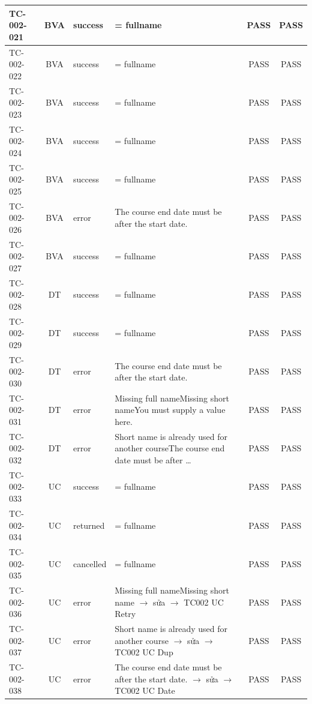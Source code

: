 {\begin{longtable}{|l|c|L{1.4cm}|L{6.0cm}|c|c|}
TC-002-021 & BVA & success & = fullname & PASS & PASS \\ \hline
TC-002-022 & BVA & success & = fullname & PASS & PASS \\ \hline
TC-002-023 & BVA & success & = fullname & PASS & PASS \\ \hline
TC-002-024 & BVA & success & = fullname & PASS & PASS \\ \hline
TC-002-025 & BVA & success & = fullname & PASS & PASS \\ \hline
TC-002-026 & BVA & error & The course end date must be after the start date. & PASS & PASS \\ \hline
TC-002-027 & BVA & success & = fullname & PASS & PASS \\ \hline
TC-002-028 & DT & success & = fullname & PASS & PASS \\ \hline
TC-002-029 & DT & success & = fullname & PASS & PASS \\ \hline
TC-002-030 & DT & error & The course end date must be after the start date. & PASS & PASS \\ \hline
TC-002-031 & DT & error & Missing full name\textbar{}Missing short name\textbar{}You must supply a value here. & PASS & PASS \\ \hline
TC-002-032 & DT & error & Short name is already used for another course\textbar{}The course end date must be after \dots{} & PASS & PASS \\ \hline
TC-002-033 & UC & success & = fullname & PASS & PASS \\ \hline
TC-002-034 & UC & returned & = fullname & PASS & PASS \\ \hline
TC-002-035 & UC & cancelled & = fullname & PASS & PASS \\ \hline
TC-002-036 & UC & error & Missing full name\textbar{}Missing short name $\rightarrow$ sửa $\rightarrow$ TC002 UC Retry & PASS & PASS \\ \hline
TC-002-037 & UC & error & Short name is already used for another course $\rightarrow$ sửa $\rightarrow$ TC002 UC Dup & PASS & PASS \\ \hline
TC-002-038 & UC & error & The course end date must be after the start date. $\rightarrow$ sửa $\rightarrow$ TC002 UC Date & PASS & PASS \\ \hline
\end{longtable}}

